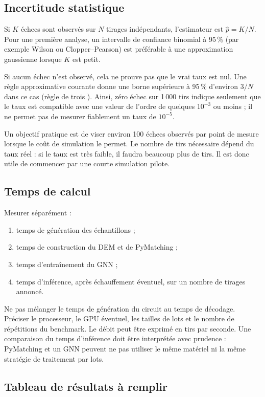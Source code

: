 \documentclass[11pt,a4paper]{article}
\begin{document}
\subsection{Incertitude statistique}

Si $K$ échecs sont observés sur $N$ tirages indépendants, l'estimateur est
$\hat p=K/N$. Pour une première analyse, un intervalle de confiance binomial
à 95\,\% (par exemple Wilson ou Clopper--Pearson) est préférable à une
approximation gaussienne lorsque $K$ est petit.

Si aucun échec n'est observé, cela ne prouve pas que le vrai taux est nul.
Une règle approximative courante donne une borne supérieure à 95\,\%
d'environ $3/N$ dans ce cas (\og règle de trois \fg{}). Ainsi, zéro échec
sur 1\,000 tirs indique seulement que le taux est compatible avec une valeur
de l'ordre de quelques $10^{-3}$ ou moins ; il ne permet pas de mesurer
fiablement un taux de $10^{-5}$.

Un objectif pratique est de viser environ 100 échecs observés par point de
mesure lorsque le coût de simulation le permet. Le nombre de tirs nécessaire
dépend du taux réel : si le taux est très faible, il faudra beaucoup plus
de tirs. Il est donc utile de commencer par une courte simulation pilote.

\subsection{Temps de calcul}

Mesurer séparément :
\begin{enumerate}
 \item temps de génération des échantillons ;
 \item temps de construction du DEM et de PyMatching ;
 \item temps d'entraînement du GNN ;
 \item temps d'inférence, après échauffement éventuel, sur un nombre de
 tirages annoncé.
\end{enumerate}
Ne pas mélanger le temps de génération du circuit au temps de décodage.
Préciser le processeur, le GPU éventuel, les tailles de lots et le nombre
de répétitions du benchmark. Le débit peut être exprimé en tirs par seconde.
Une comparaison du temps d'inférence doit être interprétée avec prudence :
PyMatching et un GNN peuvent ne pas utiliser le même matériel ni la même
stratégie de traitement par lots.

\subsection{Tableau de résultats à remplir}
\end{document}
